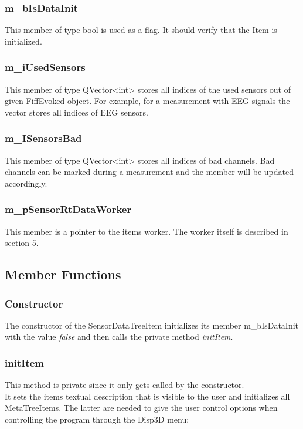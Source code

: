 \subsubsection{m\_bIsDataInit}
This member of type bool is used as a flag. It should verify that the Item is initialized.

\subsubsection{m\_iUsedSensors}
This member of type QVector<int> stores all indices of the used sensors out of given FiffEvoked object. For example, for a measurement with EEG signals the vector stores all indices of EEG sensors.

\subsubsection{m\_ISensorsBad}
This member of type QVector<int> stores all indices of bad channels. Bad channels can be marked during a measurement and the member will be updated accordingly.

\subsubsection{m\_pSensorRtDataWorker}
This member is a pointer to the items worker. The worker itself is described in section 5.

\subsection{Member Functions}

\subsubsection{Constructor}

The constructor of the SensorDataTreeItem initializes its member m\_bIsDataInit with the value \textit{false} and then calls the private method \textit{initItem}.

\subsubsection{initItem}

This method is private since it only gets called by the constructor.\\
It sets the items textual description that is visible to the user and initializes all MetaTreeItems. The latter are needed to give the user control options when controlling the program through the Disp3D menu:

